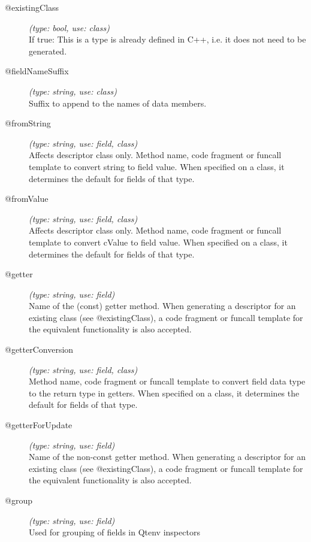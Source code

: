 \begin{description}
\item[@existingClass] \textit{(type: bool, use: class)} \\
  If true: This is a type is already defined in C++, i.e. it does not need to
  be generated.

\item[@fieldNameSuffix] \textit{(type: string, use: class)} \\
  Suffix to append to the names of data members.

\item[@fromString] \textit{(type: string, use: field, class)} \\
  Affects descriptor class only. Method name, code fragment or funcall
  template to convert string to field value. When specified on a class, it
  determines the default for fields of that type.

\item[@fromValue] \textit{(type: string, use: field, class)} \\
  Affects descriptor class only. Method name, code fragment or funcall
  template to convert cValue to field value. When specified on a class, it
  determines the default for fields of that type.

\item[@getter] \textit{(type: string, use: field)} \\
  Name of the (const) getter method. When generating a descriptor for an
  existing class (see @existingClass), a code fragment or funcall template for
  the equivalent functionality is also accepted.

\item[@getterConversion] \textit{(type: string, use: field, class)} \\
  Method name, code fragment or funcall template to convert field data type to
  the return type in getters. When specified on a class, it determines the
  default for fields of that type.

\item[@getterForUpdate] \textit{(type: string, use: field)} \\
  Name of the non-const getter method. When generating a descriptor for an
  existing class (see @existingClass), a code fragment or funcall template for
  the equivalent functionality is also accepted.

\item[@group] \textit{(type: string, use: field)} \\
  Used for grouping of fields in Qtenv inspectors


\end{description}
